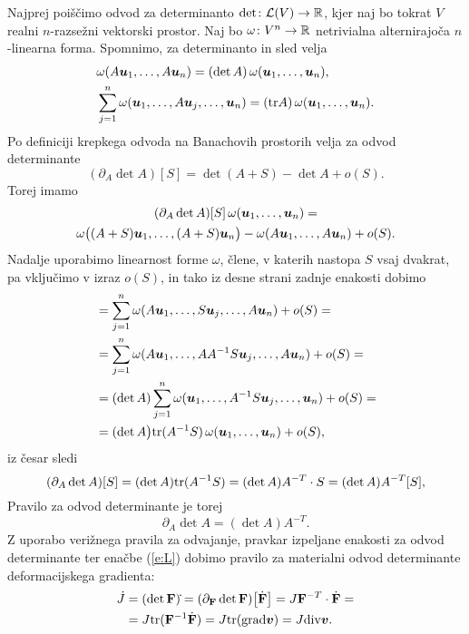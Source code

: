 Najprej poiščimo odvod za determinanto $\det\colon\mathcal L(V)\to\mathbb R$, kjer naj bo tokrat $V$
realni $n$-razsežni vektorski prostor. Naj bo $\omega\colon V^n\to\mathbb R$ netrivialna
alternirajoča $n$-linearna forma. Spomnimo, za determinanto in sled velja
\begin{align*}
	&\omega(A\boldsymbol u_1,\dots,A\boldsymbol u_n)=(\det A)\,\omega(\boldsymbol u_1,\dots,\boldsymbol u_n), \\
	&\sum_{j=1}^n\omega(\boldsymbol u_1,\dots,A\boldsymbol u_j,\dots,\boldsymbol u_n)=(\mathrm{tr} A)\,\omega(\boldsymbol u_1,\dots,\boldsymbol u_n).
\end{align*}
Po definiciji krepkega odvoda na Banachovih prostorih velja za odvod determinante
\[ (\partial_{A}\det A)[S] = \det(A+S) - \det A + o(S). \]
Torej imamo
\begin{multline*}
	(\partial_{A}\det A)[S]\,\omega(\boldsymbol u_1,\dots,\boldsymbol u_n)=\\
	\omega\big((A+S)\boldsymbol u_1,\dots,(A+S)\boldsymbol u_n\big) -
	\omega(A\boldsymbol u_1,\dots,A\boldsymbol u_n) + o(S).
\end{multline*}
Nadalje uporabimo linearnost forme $\omega$, člene, v katerih nastopa $S$ vsaj dvakrat,
pa vključimo v izraz $o(S)$, in tako iz desne strani zadnje enakosti dobimo
\begin{align*}
	&= \sum_{j=1}^n\omega(A\boldsymbol u_1,\dots,S\boldsymbol u_j,\dots,A\boldsymbol u_n) + o(S) = \\
	&= \sum_{j=1}^n\omega(A\boldsymbol u_1,\dots,AA^{-1}S\boldsymbol u_j,\dots,A\boldsymbol u_n) + o(S) = \\
	&= (\det A)\sum_{j=1}^n\omega(\boldsymbol u_1,\dots,A^{-1}S\boldsymbol u_j,\dots,\boldsymbol u_n) + o(S) = \\
	&= (\det A\big)\mathrm{tr}(A^{-1}S)\,\omega(\boldsymbol u_1,\dots,\boldsymbol u_n) + o(S),
\end{align*}
iz česar sledi
\[
	(\partial_{A}\det A)[S] = (\det A)\mathrm{tr}(A^{-1}S) = (\det A)A^{-T}\cdot S=(\det A)A^{-T}[S],
\]
Pravilo za odvod determinante je torej
\[ \partial_{A}\det A=(\det A)A^{-T}. \]
Z uporabo verižnega pravila za odvajanje, pravkar izpeljane enakosti za odvod determinante
ter enačbe (\ref{e:L}) dobimo pravilo za materialni odvod determinante deformacijskega gradienta:
\begin{align}
	\dot{J}&=(\det\mathbf F)\dot{}=(\partial_{\mathbf F}\det\mathbf F)\big[\dot{\mathbf F}\big]=J\mathbf F^{-T}\cdot\dot{\mathbf F}=
	\nonumber \\ &= J\mathrm{tr}(\mathbf F^{-1}\dot{\mathbf F}) = J\mathrm{tr}(\mathrm{grad}\boldsymbol v)=J\mathrm{div}\boldsymbol v. \label{e:dotJ}
\end{align}

